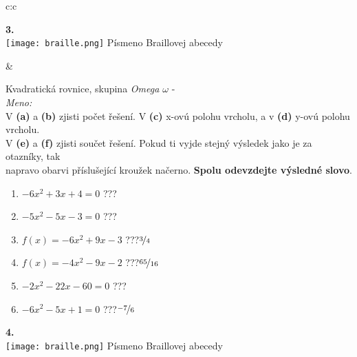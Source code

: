 \documentclass[10pt]{report}
\begin{document}
\begin{tabular}{c:c}
\begin{minipage}[c][99mm][t]{0.49\linewidth}
\begin{center}
\begin{minipage}{0.20\linewidth}
\begin{center}
{\Huge\bfseries 3.} \\[2mm]
\texttt{[image: braille.png]}
{\small Písmeno Braillovej abecedy}
\end{center}
\end{minipage}
\end{center}
\end{minipage}
&
\begin{minipage}[c][99mm][t]{0.49\linewidth}
\begin{center}
\vspace{7mm}
{\huge Kvadratická rovnice, skupina \textit{Omega $\omega$} -}\\[4.5mm]
\textit{Meno:}\phantom{xxxxxxxxxxxxxxxxxxxxxxxxxxxxxxxxxxxxxxxxxxxxxxxxxxxxxxxxxxxxxxxxx}\\[3.5mm]
V \textbf{(a)} a \textbf{(b)} zjisti počet řešení. V \textbf{(c)} x-ovú polohu vrcholu, a v \textbf{(d)} y-ovú polohu vrcholu.\\V \textbf{(e)} a \textbf{(f)} zjisti součet řešení. Pokud ti vyjde stejný výsledek jako je za otazníky, tak\\napravo obarvi příslušející kroužek načerno. \textbf{Spolu odevzdejte výsledné slovo}.\\[3mm]
\begin{minipage}{0.77\linewidth}
\begin{center}
\begin{varwidth}{\textwidth}
\begin{enumerate}
\large
\item $-6x^2+3x+4=0$\quad \dotfill\; ???\;\dotfill {}
\item $-5x^2-5x-3=0$\quad \dotfill\; ???\;\dotfill {}
\item $f(x)=-6x^2+9x-3$\quad \dotfill\; ???\;\dotfill \quad $\nicefrac{3}{4}$
\item $f(x)=-4x^2-9x-2$\quad \dotfill\; ???\;\dotfill \quad $\nicefrac{65}{16}$
\item $-2x^2-22x-60=0$\quad \dotfill\; ???\;\dotfill {}
\item $-6x^2-5x+1=0$\quad \dotfill\; ???\;\dotfill \quad $\nicefrac{-7}{6}$
\end{enumerate}
\end{varwidth}
\end{center}
\end{minipage}
\begin{minipage}{0.20\linewidth}
\begin{center}
{\Huge\bfseries 4.} \\[2mm]
\texttt{[image: braille.png]}
{\small Písmeno Braillovej abecedy}
\end{center}
\end{minipage}
\end{center}
\end{minipage}

\end{tabular}
\end{document}
